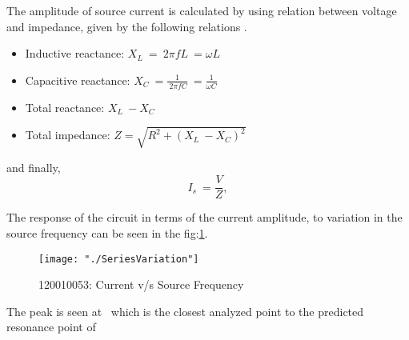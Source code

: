 \documentclass[12pt, twosides]{article}
\newcommand{\rollno}{120010053}
\newcommand{\voltage}{\ensuremath{V}}
\newcommand{\curr}{I}
\newcommand{\res}{R}
\newcommand{\capc}{C}
\newcommand{\ind}{L}
\newcommand{\react}{X}
\begin{document}
			The amplitude of source current is calculated by using relation between voltage and impedance, given by the following relations \cite{ElecTut}.
			\begin{itemize}[label=\textbullet, leftmargin=*]
				\item Inductive reactance: \( \react_\ind \ = \ 2 \pi f \ind \ = \omega \ind \)
				\item Capacitive reactance: \( \react_\capc \ = \frac{1}{\ 2 \pi f \capc} \ = \frac{1}{\omega \capc} \)
				\item Total reactance: \( \react_\ind \ - \react_\capc\)
				\item Total impedance: \( Z = \sqrt{\res^2 + (\react_\ind \ - \react_\capc)^2} \)

			\end{itemize}			
			and finally,
			\[ \curr_s \ = \frac{\voltage}{Z},\]
	

			The response of the circuit in terms of the current amplitude, to variation in the source frequency can be seen in the fig:\ref{fig:series variation}.
	
			\begin{figure}[H]
			\centering
				\texttt{[image: "./SeriesVariation"]}
			\caption{\rollno: Current v/s Source Frequency}
			\label{fig:series variation}
			\end{figure}	

			The peak is seen at \peakSer \  which is the closest analyzed point to the predicted resonance point of \resonSer
		
	\clearpage

	
		
\end{document}
